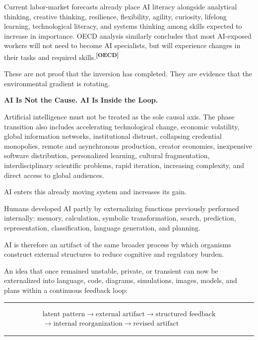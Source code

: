 \documentclass[10pt]{article}
\newcommand{\ActiveAccent}{Industrial}
\newcommand{\papersection}[2]{%
  \Needspace{8\baselineskip}
  \vspace{1.1em}
  \noindent\begin{minipage}[t]{0.12\textwidth}
    \vspace{1pt}{\sffamily\bfseries\fontsize{17}{17}\selectfont\textcolor{\ActiveAccent}{#1}}
  \end{minipage}%
  \begin{minipage}[t]{0.86\textwidth}
    {\sffamily\bfseries\fontsize{16.2}{19}\selectfont #2}\par
    \vspace{0.35em}{\color{\ActiveAccent}\rule{\linewidth}{1.15pt}}
  \end{minipage}
  \vspace{0.55em}
}
\newcommand{\subhead}[1]{\Needspace{4\baselineskip}\vspace{0.5em}{\sffamily\bfseries\fontsize{10.5}{13}\selectfont\textcolor{\ActiveAccent}{#1}}\par\vspace{-0.1em}}
\newcommand{\sourcecue}[1]{\textsuperscript{\sffamily\bfseries\fontsize{6.5}{7}\selectfont\textcolor{\ActiveAccent}{[#1]}}}
\newenvironment{equationpanel}{\begin{center}\begin{minipage}{0.92\linewidth}\color{\ActiveAccent}\rule{\linewidth}{0.55pt}\par\vspace{-0.25em}\color{Ink}}{\vspace{-0.10em}\par\color{\ActiveAccent}\rule{\linewidth}{0.55pt}\end{minipage}\end{center}}
\begin{document}
Current labor-market forecasts already place AI literacy alongside analytical thinking, creative thinking, resilience, flexibility, agility, curiosity, lifelong learning, technological literacy, and systems thinking among skills expected to increase in importance. OECD analysis similarly concludes that most AI-exposed workers will not need to become AI specialists, but will experience changes in their tasks and required skills.\sourcecue{OECD}

These are not proof that the inversion has completed. They are evidence that the environmental gradient is rotating.

\papersection{VI}{AI Is Not the Cause. AI Is Inside the Loop.}

Artificial intelligence must not be treated as the sole causal axis. The phase transition also includes accelerating technological change, economic volatility, global information networks, institutional distrust, collapsing credential monopolies, remote and asynchronous production, creator economies, inexpensive software distribution, personalized learning, cultural fragmentation, interdisciplinary scientific problems, rapid iteration, increasing complexity, and direct access to global audiences.

AI enters this already moving system and increases its gain.

\subhead{1. AI as an emergent artifact}

Humans developed AI partly by externalizing functions previously performed internally: memory, calculation, symbolic transformation, search, prediction, representation, classification, language generation, and planning.

AI is therefore an artifact of the same broader process by which organisms construct external structures to reduce cognitive and regulatory burden.

\subhead{2. AI as a coupling layer}

An idea that once remained unstable, private, or transient can now be externalized into language, code, diagrams, simulations, images, models, and plans within a continuous feedback loop:

\begin{equationpanel}
\begin{equation*}
\begin{gathered}
\text{latent pattern}\rightarrow\text{external artifact}\rightarrow\text{structured feedback}\\
\rightarrow\text{internal reorganization}\rightarrow\text{revised artifact}
\end{gathered}
\end{equation*}
\end{equationpanel}
\end{document}
